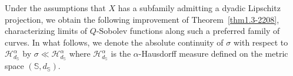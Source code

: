 \documentclass[10pt]{amsart}
\numberwithin{equation}{section}
\newcommand{\Ha}{\mathcal{H}}
\begin{document}



{
Under the assumptions that $X$ has a subfamily admitting a dyadic Lipschitz projection,}
we obtain the following improvement of Theorem~\ref{thm1.3-2208}, characterizing limits of $Q$-Sobolev functions along such a preferred family of curves.  In what follows, we denote the absolute continuity of $\sigma$ with respect to $\Ha^\alpha_{d_{\mathbb S}}$ by $\sigma\ll\Ha^\alpha_{d_\mathbb S}${
 where $\mathcal H^\alpha_{d_{\mathbb S}}$ is the $\alpha$-Hausdorff measure defined on the metric space $(\mathbb S, d_{\mathbb S})$}.

\end{document}
